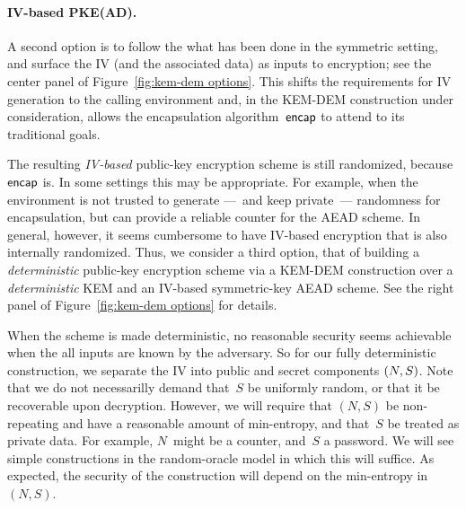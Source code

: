 \paragraph{IV-based PKE(AD). }
A second option is to follow the what has been done in the symmetric setting, and surface the IV (and the associated data) as inputs to encryption; see the center panel of Figure~\ref{fig:kem-dem options}.  
This shifts the requirements for IV generation to the calling environment and, in the KEM-DEM construction under consideration, allows the encapsulation algorithm~$\mathsf{encap}$ to attend to its traditional goals.  %

The resulting \emph{IV-based} public-key encryption scheme is still randomized, because $\mathsf{encap}$ is.  In some settings this may be appropriate.  For example, when the environment is not trusted to generate ---~and keep private~--- randomness for encapsulation, but can provide a reliable counter for the AEAD scheme.    In general, however, it seems cumbersome to have IV-based encryption that is also internally randomized.  
Thus, we consider a third option, that of building a \emph{deterministic} public-key encryption scheme via a KEM-DEM construction over a \emph{deterministic} KEM and an IV-based symmetric-key AEAD scheme.  See the right panel of Figure~\ref{fig:kem-dem options} for details.  

When the scheme is made deterministic, no reasonable security seems achievable when the all inputs are known by the adversary.  So for our fully deterministic construction, we separate the IV into public and secret components $(N,S)$.   
Note that we do not necessarilly demand that~$S$ be uniformly random, or that it be recoverable upon decryption.  However, we will require that $(N,S)$ be non-repeating and have a reasonable amount of min-entropy, and that~$S$ be treated as private data.  For example, $N$~might be a counter, and~$S$ a password.  We will see simple constructions in the random-oracle model in which this will suffice. As expected, the security of the construction will depend on the min-entropy in $(N,S)$. 

